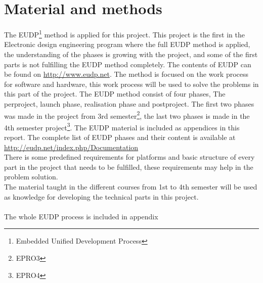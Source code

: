 \chapter{Material and methods}
The EUDP\footnote{Embedded Unified Development Process} method is applied for this project. This project is the first in the Electronic design engineering program where the full EUDP method is applied, the understanding of the phases is growing with the project, and some of the first parts is not fulfilling the EUDP method completely. The contents of EUDP can be found on \url{http://www.eudp.net}. The method is focused on the work process for software and hardware, this work process will be used to solve the problems in this part of the project. The EUDP method consist of four phases, The perproject, launch phase, realisation phase and postproject. The first two phases was made in the project from 3rd semester\footnote{EPRO3}, the last two phases is made in the 4th semester project\footnote{EPRO4}. The EUDP material is included as appendices in this report. The complete list of EUDP phases and their content is available at \url{http://eudp.net/index.php/Documentation}\\
There is some predefined requirements for platforms and basic structure of every part in the project that needs to be fulfilled, these requirements may help in the problem solution.\\
The material taught in the different courses from 1st to 4th semester will be used as knowledge for developing the technical parts in this project.\\
\\
The whole EUDP process is included in appendix